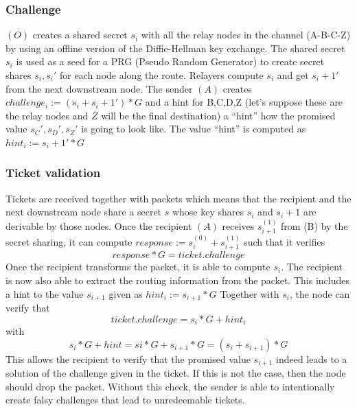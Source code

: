 \subsubsection*{Challenge}
$(O)$ creates a shared secret $s_i$ with all the relay nodes in the channel (A-B-C-Z) by using an offline version of the Diffie-Hellman key exchange.
\newline The shared secret $s_i$ is used as a seed for a PRG (Pseudo Random Generator) to create secret shares $s_i,s_i'$ for each node along the route. 
Relayers compute $s_i$ and get $s_i+1'$ from the next downstream node. 
\newline The sender $(A)$ creates $challenge_i:=(s_i+s_i+1')*G$ and a hint for B,C,D,Z (let’s suppose these are the relay nodes and $Z$ will be the final destination) a “hint” how the promised value $s_C',s_D',s_Z'$ is going to look like. 
The value “hint” is computed as $hint_i:=s_i+1'*G$ 


\subsubsection{Ticket validation}
Tickets are received together with packets which means that the recipient and the next downstream node share a secret $s$ whose key shares $s_i$ and $s_i+1$ are derivable by those nodes.
\newline Once the recipient $(A)$ receives $s_{i+1}^{(1)}$ from (B) by the secret sharing, it can compute $response:=s_i^{(0)}+s_{i+1}^{(1)}$ such that it verifies  
$$response*G=ticket.challenge$$
Once the recipient transforms the packet, it is able to compute $s_i$. The recipient is now also able to extract the routing information from the packet. 
This includes a hint to the value $s_{i+1}$ given as $hint_i:=s_{i+1}*G$ 
\newline Together with $s_i$, the node can verify that $$ticket.challenge=s_i*G+hint_i$$ with $$s_i*G+hint=si*G+s_{i+1}*G=(s_i+s_{i+1})*G$$ 
This allows the recipient to verify that the promised value $s_{i+1}$ indeed leads to a solution of the challenge given in the ticket. 
If this is not the case, then the node should drop the packet.
\newline Without this check, the sender is able to intentionally create falsy challenges that lead to unredeemable tickets.


